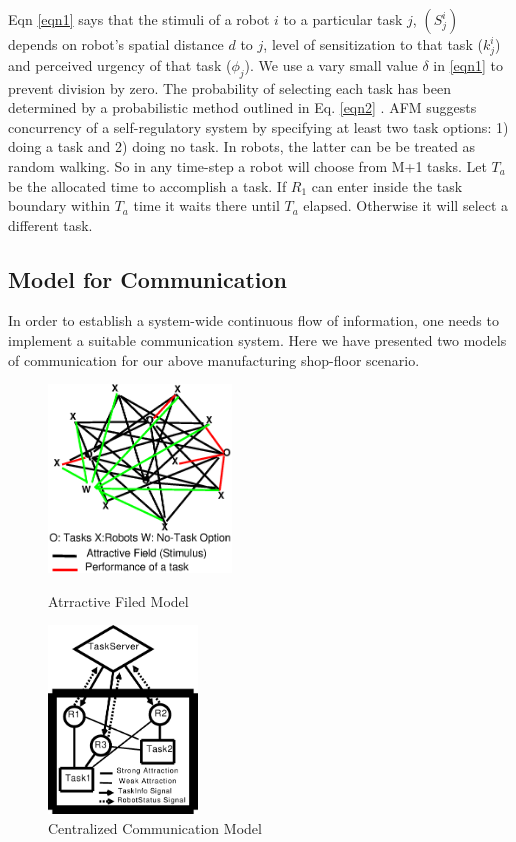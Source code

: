 \documentclass{llncs}
\begin{document}
Eqn \ref{eqn1} says that the stimuli of a robot $i$ to a particular task $j$, $(S_{j}^{i})$ depends on robot's spatial distance $d$ to $j$, level of sensitization to that task ($k_{j}^{i}$) and perceived urgency of that task ($\phi _{j}$). We use a vary small value $\delta$ in \ref{eqn1} to prevent  division by zero. The probability of selecting each task has been determined by a probabilistic method outlined in Eq. \ref{eqn2} . 
AFM suggests concurrency of a self-regulatory system by specifying at least two task options: 1) doing a task and 2) doing no task. In robots, the latter can be   be treated as random walking. So in any time-step a robot will choose from M+1 tasks. Let $T_a$ be the allocated time to accomplish a task. If $R_1$ can enter inside the task boundary within $T_a$ time it waits there until $T_a$ elapsed. Otherwise it will select a different task. 

\subsection{Model for Communication}
In order to establish a system-wide continuous flow of information, one needs to implement a  suitable communication system. Here we have presented two models of communication for our above manufacturing shop-floor scenario.
%
\begin{figure}
\begin{minipage}[t]{0.48\linewidth}
\centering
\includegraphics[height=5cm,  angle=0]
{../dia-files/AFM-Diag2.eps}
\caption{\small Atrractive Filed Model}
\label{fig:g1} %
\end{minipage}
\hspace{0.5cm}
\begin{minipage}[t]{0.48\linewidth}
\centering
\includegraphics[height=5cm, angle=0]{../dia-files/CentralizedComm.eps}
\caption{\small Centralized Communication Model}
\label{fig:g2} %
\end{minipage}
\end{figure}
\end{document}
